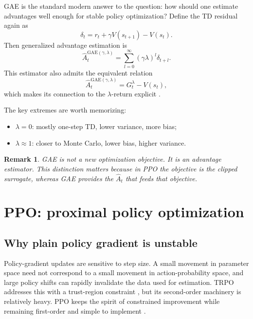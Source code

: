 \documentclass[11pt]{article}
\newtheorem{remark}{Remark}
\newcommand{\1}{\mathbf{1}}
\begin{document}
GAE is the standard modern answer to the question: how should one estimate advantages well enough for stable policy optimization? Define the TD residual again as
\begin{equation}
\delta_t=r_t+\gamma V(s_{t+1})-V(s_t).
\end{equation}
Then generalized advantage estimation is
\begin{equation}
\hat A_t^{\mathrm{GAE}(\gamma,\lambda)} = \sum_{l=0}^{\infty}(\gamma\lambda)^l\delta_{t+l}.
\end{equation}
This estimator also admits the equivalent relation
\begin{equation}
\hat A_t^{\mathrm{GAE}(\gamma,\lambda)} = G_t^{\lambda}-V(s_t),
\end{equation}
which makes its connection to the $\lambda$-return explicit \cite{SchulmanGAE2016}.

The key extremes are worth memorizing:
\begin{itemize}
    \item $\lambda=0$: mostly one-step TD, lower variance, more bias;
    \item $\lambda\approx 1$: closer to Monte Carlo, lower bias, higher variance.
\end{itemize}

\begin{remark}
GAE is \emph{not} a new optimization objective. It is an advantage estimator. This distinction matters because in PPO the objective is the clipped surrogate, whereas GAE provides the $\hat A_t$ that feeds that objective.
\end{remark}

\section{PPO: proximal policy optimization}

\subsection{Why plain policy gradient is unstable}

Policy-gradient updates are sensitive to step size. A small movement in parameter space need not correspond to a small movement in action-probability space, and large policy shifts can rapidly invalidate the data used for estimation. TRPO addresses this with a trust-region constraint \cite{SchulmanTRPO2015}, but its second-order machinery is relatively heavy. PPO keeps the spirit of constrained improvement while remaining first-order and simple to implement \cite{SchulmanPPO2017}.
\end{document}
